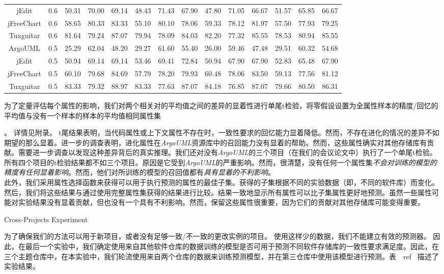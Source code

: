 {\begin{table}[htbp]
\begin{tabular}{cccccccccccccc}
jEdit&0.6&	50.31&	70.00&	69.14&	48.43&	71.43&	67.90&	47.80&	71.05&	66.67&	51.57&	65.85&	66.67\\
jFreeChart&0.6&	58.65&	80.33&	83.33&	55.10&	80.10&	78.06&	59.33&	78.12&	81.97&	57.50&	77.93&	79.25\\
Tuxguitar&0.6&	81.64&	79.24&	87.07&	79.94&	78.09&	84.03&	82.20&	77.32&	85.55&	78.53&	80.94&	85.55\\
ArgoUML&0.5&	25.29&	62.04&	48.20&	29.27&	61.60&	55.40&	26.00&	59.46&	47.48&	29.51&	60.32&	54.68\\
jEdit&0.5&	50.94&	69.14&	69.14&	53.46&	69.41&	72.84&	50.94&	67.90&	67.90&	52.83&	65.48&	67.90\\
jFreeChart&0.5&	60.10&	79.68&	84.69&	57.79&	78.20&	79.93&	60.48&	78.06&	83.50&	59.13&	77.56&	81.12\\
Tuxguitar&0.5&	83.33&	79.32&	88.97&	83.33&	77.63&	87.07&	84.18&	76.85&	87.07&	79.66&	80.50&      86.31\\
\bottomrule[1.5pt]
\end{tabular}
\end{table}

为了定量评估每个属性的影响，我们对两个相关对的平均值之间的差异的显着性进行单尾t检验，将零假设设置为全属性样本的精度/回忆的平均值与没有一个样本的样本的平均值相同属性集}。
详情见附录。 t尾结果表明，当代码属性或上下文属性不存在时，一致性要求的回忆能力显着降低。然而，不存在进化的情况的差异不如期望的那么显着。进一步的调查表明，进化属性在{\em ArgoUML}资源库中的召回能力没有显着的帮助。然而，这些属性确实对其他存储库有贡献。需要进一步调查以发现这种差异背后的真实推理。{我们还对没有{\em  ArgoUML}的三个项目（在我们的会议论文中）执行了一个单尾t检验。所有四个项目的t检验结果都不如三个项目。原因是它受到{\em ArgoUML}的严重影响。}然而，很清楚，没有任何一个属性集{\em 不会对训练的模型的精度有任何显着影响}。然而，他们对所训练的模型的召回值都有{\em 具有显着的不利影响}。 \\

此外，我们采用属性选择函数来获得可以用于执行预测的属性的最佳子集。获得的子集根据不同的实验数据（即，不同的软件库）而变化。然后，我们将这些结果与通过使用完整属性集获得的结果进行比较。结果一致地显示所有属性可以比子集属性更好地预测。虽然一些属性可能对实验结果没有显着贡献，但也没有一个具有不利影响。然而，保留这些属性很重要，因为它们的贡献对其他存储库可能变得重要。

{Cross-Projects Experiment}

为了确保我们的方法可以用于新项目，或者没有足够一致/不一致的更改实例的项目。 使用这样少的数据，我们不能建立有效的预测器。 因此，在最后一个实验中，我们确定使用来自其他软件仓库的数据训练的模型是否可用于预测不同软件存储库的一致性要求满足度。因此，在三个主题仓库中，在本实验中，我们轮流使用来自两个仓库的数据来训练预测模型，并在第三仓库中使用该模型进行预测。表~\ ref {}~描述了实验结果。

